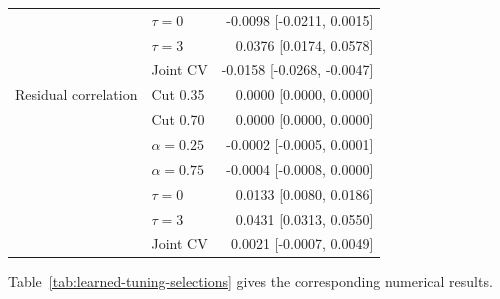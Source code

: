 \documentclass[11pt,a4paper]{article}
\begin{document}
\begin{table}[htbp]
\begin{tabular}{llr}
 & $\tau=0$ & -0.0098 [-0.0211, 0.0015] \\
 & $\tau=3$ & 0.0376 [0.0174, 0.0578] \\
 & Joint CV & -0.0158 [-0.0268, -0.0047] \\
\addlinespace
Residual correlation & Cut 0.35 & 0.0000 [0.0000, 0.0000] \\
 & Cut 0.70 & 0.0000 [0.0000, 0.0000] \\
 & $\alpha=0.25$ & -0.0002 [-0.0005, 0.0001] \\
 & $\alpha=0.75$ & -0.0004 [-0.0008, 0.0000] \\
 & $\tau=0$ & 0.0133 [0.0080, 0.0186] \\
 & $\tau=3$ & 0.0431 [0.0313, 0.0550] \\
 & Joint CV & 0.0021 [-0.0007, 0.0049] \\
\bottomrule
\end{tabular}
\end{table}

\noindent Table~\ref{tab:learned-tuning-selections} gives the corresponding numerical results.
\end{document}
